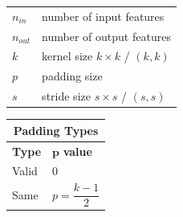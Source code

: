 \begin{table}[h]
    \begin{minipage}[t]{0.5\linewidth}
        \begin{table}[H]
            \begin{tabular}{l l}
                $n_{in}$ & number of input features \\
                $n_{out}$ & number of output features \\
                $k$ & kernel size $k\times k$ / $(k, k)$ \\
                $p$ & padding size \\
                $s$ & stride size $s\times s$ / $(s, s)$ \\
            \end{tabular}
        \end{table}        
    \end{minipage}
    \hfill
    \begin{minipage}[t]{0.5\linewidth}
        \begin{table}[H]
            \begin{tabular}{l|l}
                \multicolumn{2}{c}{Padding Types}\\ \hline
                \textbf{Type} & $\mathbf{p}$ \textbf{value} \\ \hline
                Valid & 0 \\
                Same & \( \displaystyle p = \dfrac{k - 1}{2} \) \\
                
            \end{tabular}
        \end{table}        
    \end{minipage}
\end{table}








